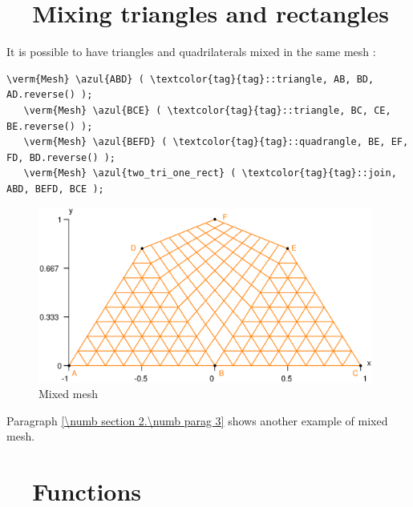 \section{~~Mixing triangles and rectangles}\label{\numb section 1.\numb parag 5}

It is possible to have triangles and quadrilaterals mixed in the same mesh :

\begin{Verbatim}[commandchars=\\\{\},formatcom=\small\tt,frame=single,
   label=parag-\ref{\numb section 1.\numb parag 5}.cpp,rulecolor=\color{coment},
   baselinestretch=0.94,framesep=2mm]
   \verm{Mesh} \azul{ABD} ( \textcolor{tag}{tag}::triangle, AB, BD, AD.reverse() );
   \verm{Mesh} \azul{BCE} ( \textcolor{tag}{tag}::triangle, BC, CE, BE.reverse() );
   \verm{Mesh} \azul{BEFD} ( \textcolor{tag}{tag}::quadrangle, BE, EF, FD, BD.reverse() );
   \verm{Mesh} \azul{two_tri_one_rect} ( \textcolor{tag}{tag}::join, ABD, BEFD, BCE );
\end{Verbatim}

\begin{figure}[ht] \centering
  \includegraphics[width=110mm]{two-tri-one-rect}
  \caption{Mixed mesh}
  \label{\numb section 1.\numb fig 8}
\end{figure}

Paragraph \ref{\numb section 2.\numb parag 3} shows another example of mixed mesh.


\section{~~Functions}\label{\numb section 1.\numb parag 6}

